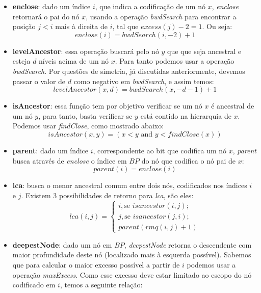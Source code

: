 \begin{itemize}
        \item \textbf{enclose}: dado um índice $i$, que indica a codificação de um nó $x$, \textit{enclose} retornará o pai do nó $x$, usando a operação \textit{bwdSearch} para encontrar a posição $j<i$ mais à direita de $i$, tal que $excess(j) - 2 = 1$. Ou seja:
        $$enclose(i) = bwdSearch(i,-2) + 1$$

        \item  \textbf{levelAncestor}: essa operação buscará pelo nó $y$ que que seja ancestral e esteja $d$ níveis acima de um nó $x$. Para tanto podemos usar a operação \textit{bwdSearch}. Por questões de simetria, já discutidas anteriormente, devemos passar o valor de $d$ como negativo em \textit{bwdSearch}, e assim temos:
        $$levelAncestor(x,d) = bwdSearch(x,-d-1)+1$$
        
        \item \textbf{isAncestor}: essa função tem por objetivo verificar se um nó $x$ é ancestral de um nó $y$, para tanto, basta verificar se $y$ está contido na hierarquia de $x$. Podemos usar \textit{findClose}, como mostrado abaixo:
        $$ isAncestor(x,y) = (x < y  \mbox{ and }  y < findClose(x))$$
        
        \item \textbf{parent}: dado um índice $i$, correspondente ao bit que codifica um nó $x$, \textit{parent} busca através de \textit{enclose} o índice em $BP$ do nó que codifica
        o nó pai de $x$:
        $$parent(i) = enclose(i)$$
        
        \item \textbf{lca}: busca o menor ancestral comum entre dois nós, codificados nos índices $i$ e $j$. Existem 3 possibilidades de retorno para \textit{lca}, são eles:
        $$lca(i,j) =
               \begin{cases}
                     i,  \mbox{se } isancestor(i,j); \\
                    j, \mbox{se } isancestor(j,i); \\
                    parent(rmq(i ,j)+1)
               \end{cases}
        $$

        \item \textbf{deepestNode}: dado um nó em $BP$, \textit{deepestNode} retorna o descendente com maior profundidade deste nó (localizado mais à esquerda possível). Sabemos que para calcular o maior excesso possível a partir de $i$ podemos usar a operação \textit{maxExcess}. Como esse excesso deve estar limitado ao escopo do nó codificado em $i$, temos a seguinte relação:


\end{itemize}
